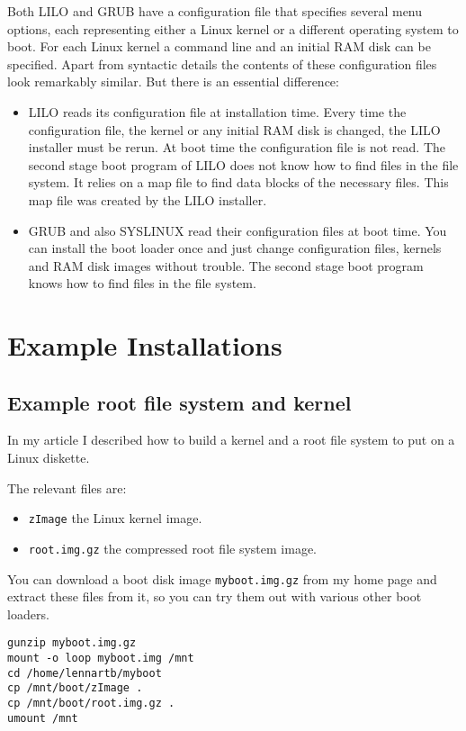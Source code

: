 \documentclass[12pt,a4paper]{article}
\begin{document}
Both LILO and GRUB have a configuration file that specifies several
menu options, each representing either a Linux kernel or a different
operating system to boot. For each Linux kernel a command line and an
initial RAM disk can be specified. Apart from syntactic details the
contents of these configuration files look remarkably similar. But
there is an essential difference:
\begin{itemize}
\item LILO reads its configuration file at installation time.  Every
time the configuration file, the kernel or any initial RAM disk is
changed, the LILO installer must be rerun. At boot time the
configuration file is not read. The second stage boot program of LILO
does not know how to find files in the file system. It relies on a map
file to find data blocks of the necessary files. This map file was
created by the LILO installer.
\item GRUB and also SYSLINUX read their configuration files at boot
time. You can install the boot loader once and just change configuration
files, kernels and RAM disk images without trouble. The second stage
boot program knows how to find files in the file system. 
\end{itemize}

\section{Example Installations}

\subsection{Example root file system and kernel}

In my article  I described how
to build a kernel and a root file system to put on a Linux diskette.

The relevant files are:
\begin{itemize}
\item {\tt zImage} the Linux kernel image.
\item {\tt root.img.gz} the compressed root file system image.
\end{itemize}

You can download a boot disk image {\tt myboot.img.gz} from my home
page and extract these files from it, so you can try them out with
various other boot loaders. 
\begin{verbatim}
gunzip myboot.img.gz
mount -o loop myboot.img /mnt
cd /home/lennartb/myboot
cp /mnt/boot/zImage .
cp /mnt/boot/root.img.gz .
umount /mnt
\end{verbatim}
\end{document}
